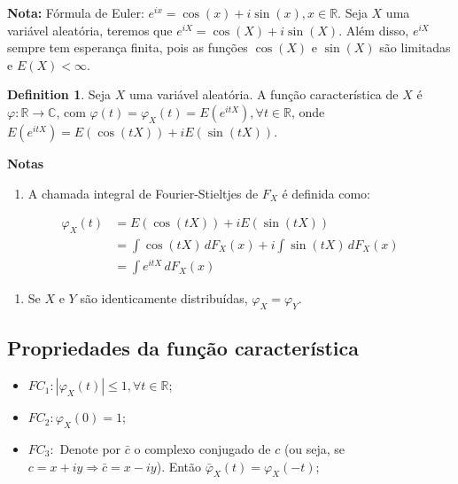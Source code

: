 \documentclass[
]{article}
\providecommand{\tightlist}{%
  \setlength{\itemsep}{0pt}\setlength{\parskip}{0pt}}
\theoremstyle{definition}
\newtheorem{definition}{Definition}[section]
\theoremstyle{definition}
\theoremstyle{definition}
\theoremstyle{definition}
\theoremstyle{remark}
\begin{document}
\textbf{Nota:} Fórmula de Euler: \(e^{ix} = \cos(x) + i \sin(x), x \in \mathbb{R}\). Seja \(X\) uma variável aleatória, teremos que \(e^{iX} = \cos(X) + i \sin(X)\). Além disso, \(e^{iX}\) sempre tem esperança finita, pois as funções \(\cos(X)\) e \(\sin(X)\) são limitadas e \(E(X) < \infty\).

\begin{definition}
Seja \(X\) uma variável aleatória. A função característica de \(X\) é \(\varphi:\mathbb{R} \to \mathbb{C}\), com \(\varphi(t) = \varphi_{X}(t) = E(e^{itX}), \forall t \in \mathbb{R}\), onde \(E(e^{itX}) = E(\cos(tX)) + iE(\sin(tX))\).
\end{definition}

\textbf{Notas}

\begin{enumerate}
\def\labelenumi{\alph{enumi})}
\tightlist
\item
  A chamada integral de Fourier-Stieltjes de \(F_{X}\) é definida como:
\end{enumerate}

\begin{align*}
\varphi_{X}(t) &= E(\cos(tX)) + iE(\sin(tX)) \\
&= \int \cos(tX)\, dF_{X}(x) + i \int \sin(tX)\, dF_{X}(x) \\
&= \int e^{itX}\, dF_{X}(x)
\end{align*}

\begin{enumerate}
\def\labelenumi{\alph{enumi})}
\setcounter{enumi}{1}
\tightlist
\item
  Se \(X\) e \(Y\) são identicamente distribuídas, \(\varphi_{X} = \varphi_{Y}\).
\end{enumerate}

\hypertarget{propriedades-da-funuxe7uxe3o-caracteruxedstica}{%
\subsection{Propriedades da função característica}\label{propriedades-da-funuxe7uxe3o-caracteruxedstica}}

\begin{itemize}
\item
  \(FC_{1}: |\varphi_{X}(t)| \le 1, \forall t \in \mathbb{R}\);
\item
  \(FC_{2}: \varphi_{X}(0) = 1\);
\item
  \(FC_{3}:\) Denote por \(\bar{c}\) o complexo conjugado de \(c\) (ou seja, se \(c = x + iy \Rightarrow \bar{c} = x - iy\)). Então \(\bar{\varphi}_{X}(t) = \varphi_{X}(-t)\);
\end{itemize}
\end{document}
